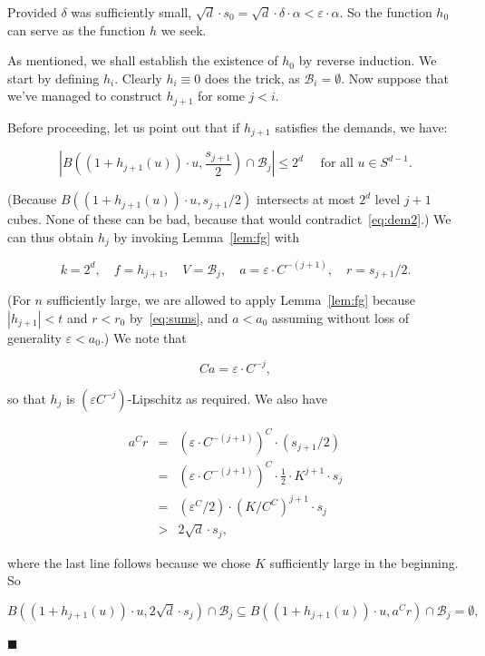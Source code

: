 \documentclass[11pt]{article}%
\newenvironment{proofof}[1]{\vspace{1ex}\noindent{\bf Proof of #1.}}{\hspace*{\fill}$\blacksquare$\vspace{1ex}}
\newcommand{\Bcal}[0]{\ensuremath{{\mathcal B}}}
\newcommand{\eps}{\varepsilon}
\begin{document}
\begin{proofof}{Lemma~\ref{lem:embed}}
\noindent 
Provided $\delta$ was sufficiently small, $\sqrt{d} \cdot s_0 = \sqrt{d} \cdot 
\delta \cdot \alpha < \eps \cdot \alpha$.
So the function $h_0$ can serve as the function $h$ we seek.

As mentioned, we shall establish the existence of $h_0$ by reverse induction. 
We start by defining $h_i$. Clearly $h_i \equiv 0$ does the trick, as $\Bcal_i=\emptyset$.
Now suppose that we've managed to construct $h_{j+1}$ for some $j < i$.

Before proceeding, let us point out that if $h_{j+1}$ satisfies the demands, we have:

\begin{equation}\label{eq:ballsiplus1}
\left| B\left( (1+h_{j+1}(u))\cdot u, \frac{s_{j+1}}{2}\right) \cap \Bcal_j \right| \leq 2^d \quad 
\text{ for all $u \in S^{d-1}$.} 
\end{equation}

\noindent
(Because $B\left( (1+h_{j+1}(u))\cdot u, s_{j+1}/2\right)$ intersects at most $2^d$ level $j+1$ cubes.
None of these can be bad, because that would contradict~\eqref{eq:dem2}.)
We can thus obtain $h_j$ by invoking Lemma~\ref{lem:fg} with 

$$ k=2^d, \quad f=h_{j+1}, \quad V = \Bcal_j, \quad a = \eps\cdot C^{-(j+1)}, \quad 
r = s_{j+1}/2. $$

\noindent
(For $n$ sufficiently large, we are allowed to apply Lemma~\ref{lem:fg} because
$|h_{j+1}| < t$ and $r < r_0$ by~\eqref{eq:sums}, and 
$a < a_0$ assuming without loss of generality $\eps < a_0$.)
We note that 

$$ Ca = \eps \cdot C^{-j}, $$

\noindent
so that $h_j$ is $(\eps C^{-j})$-Lipschitz as required. We also have 

$$ \begin{array}{rcl} 
a^C r 
& = &\left(\eps \cdot C^{-(j+1)}\right)^C \cdot (s_{j+1}/2) \\
& = & \left(\eps \cdot C^{-(j+1)}\right)^C \cdot \frac12 \cdot K^{j+1} \cdot s_{j} \\
& = & \left(\eps^C/2\right) \cdot \left(K/C^C\right)^{j+1} \cdot s_{j} \\
& > & 2\sqrt{d} \cdot s_j,
\end{array} $$

\noindent
where the last line follows because we chose $K$ sufficiently large in the beginning.
So 

$$B\left( (1+h_{j+1}(u))\cdot u, 2\sqrt{d} \cdot s_j\right) \cap \Bcal_j 
\subseteq B\left( (1+h_{j+1}(u))\cdot u, a^C r \right) \cap \Bcal_j 
= \emptyset, $$


\end{proofof}
\end{document}
